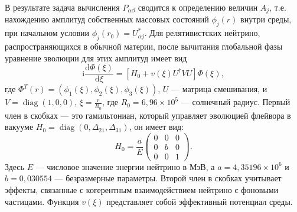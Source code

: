 \documentclass[a4paper,12pt]{article}
\newcommand{\dd}{\mathrm{d}}
\newcommand{\diag}{\operatorname{diag}}
\renewcommand{\imath}{\mathrm{i}}
\begin{document}
	В результате задача вычисления \(P_{\alpha\beta}\) сводится к
	определению величин \(A_{j}\), т.е. нахождению амплитуд
	собственных массовых состояний \(\phi_{j}(r)\) внутри среды, при начальном условии \(\phi_{j}(r_{0})=U_{\alpha j}^{*}\). Для релятивистских нейтрино, распространяющихся в обычной материи, после вычитания глобальной фазы уравнение эволюции для этих амплитуд имеет вид
	\begin{equation}\label{eq:14}
		\imath\frac{\dd\Phi(\xi)}{\dd\xi}=[H_{0}+ v(\xi)U^{\dagger}VU]\Phi(\xi),
	\end{equation}
	где \(\Phi^{T}(r)=(\phi_{1}(\xi),\phi_{2}(\xi),\phi_{3}(\xi))\), \(U\) --- матрица
	смешивания, и \(V=\diag(1,0,0)\), \(\xi=\frac{r}{R_{0}}\), где
	\(R_{0}=6,96\times10^5\) --- солнечный радиус. Первый член в скобках --- это
	гамильтониан, который управляет эволюцией флейвора в вакууме \(H_{0}=\diag(0,\Delta_{21},\Delta_{31})\),
	он имеет вид:
	\begin{equation}
		H_{0}=\frac{a}{E}
		\begin{pmatrix}
			0 & 0 & 0\\
			0 & b & 0\\
			0 & 0 & 1
		\end{pmatrix}.
	\end{equation}
	Здесь \(E\) --- числовое значение энергии нейтрино в МэВ, а
	\(a=4,35196\times10^6\) и \(b=0,030554\) --- безразмерные параметры. Второй
	член в скобках учитывает эффекты, связанные с когерентным взаимодействием
	нейтрино с фоновыми частицами. Функция \(v(\xi)\) представляет собой
	эффективный потенциал среды.
\end{document}
